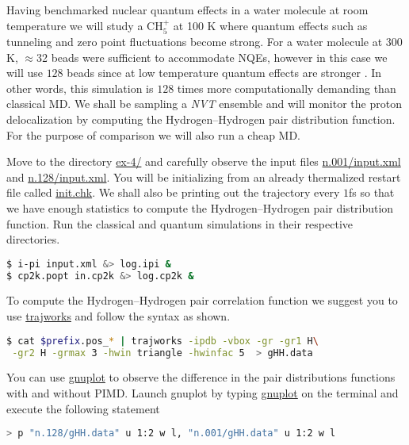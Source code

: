 \documentclass{article}
\begin{document}
\begin{Exercise}[label={ch5},title={PIMD in the strong quantum regime:  gas phase Methanium}]
\noindent Having benchmarked nuclear quantum effects in a water molecule at room temperature 
we will study a $\text{CH}_{5}^{+}$ at 100 K where quantum effects such as tunneling and 
zero point fluctuations become strong. For a water molecule at $300$K, $\approx$32 beads were 
sufficient to accommodate NQEs, however in this case we will use $128$ beads since at low 
temperature quantum effects are stronger . In other words, this simulation is $128$ times more computationally 
demanding than classical MD. We shall be sampling a \emph{NVT} ensemble and will monitor the 
proton delocalization by computing the Hydrogen--Hydrogen pair distribution function. For the 
purpose of comparison we will also run a cheap MD.

\Question
Move to the directory \url{ex-4/} and carefully observe the \ipi{} input files \url{n.001/input.xml} 
and \url{n.128/input.xml}. You will be initializing from an already thermalized restart file called 
\url{init.chk}. We shall also be printing out the trajectory every $1$fs so that we have enough 
statistics to compute the Hydrogen--Hydrogen pair distribution function. Run the classical and 
quantum simulations in their respective directories.

\begin{lstlisting}[language=bash]
$ i-pi input.xml &> log.ipi &
$ cp2k.popt in.cp2k &> log.cp2k &
\end{lstlisting}

\Question
To compute the Hydrogen--Hydrogen pair correlation function we suggest you to use \url{trajworks} and follow the syntax as shown. 
\begin{lstlisting}[language=bash]
$ cat $prefix.pos_* | trajworks -ipdb -vbox -gr -gr1 H\
 -gr2 H -grmax 3 -hwin triangle -hwinfac 5  > gHH.data 
\end{lstlisting}

\Question
You can use \url{gnuplot} to observe the difference in the pair distributions functions with and without PIMD. 
Launch gnuplot by typing \url{gnuplot} on the terminal and execute the following statement 
\begin{lstlisting}[language=bash]
> p "n.128/gHH.data" u 1:2 w l, "n.001/gHH.data" u 1:2 w l
\end{lstlisting}

\end{Exercise}



\end{document}
